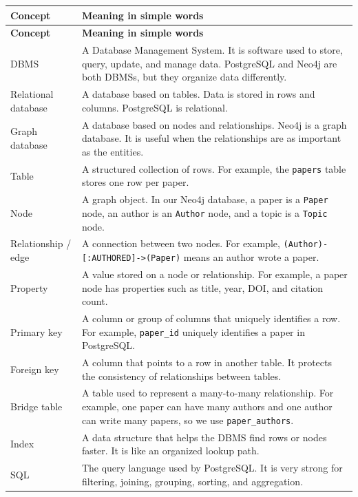 \documentclass[11pt]{article}
\begin{document}
\begin{longtable}{|p{}|p{}|}
\hline
\textbf{Concept} & \textbf{Meaning in simple words} \\
\hline
\endfirsthead
\hline
\textbf{Concept} & \textbf{Meaning in simple words} \\
\hline
\endhead
DBMS & A Database Management System. It is software used to store, query, update, and manage data. PostgreSQL and Neo4j are both DBMSs, but they organize data differently. \\
\hline
Relational database & A database based on tables. Data is stored in rows and columns. PostgreSQL is relational. \\
\hline
Graph database & A database based on nodes and relationships. Neo4j is a graph database. It is useful when the relationships are as important as the entities. \\
\hline
Table & A structured collection of rows. For example, the \texttt{papers} table stores one row per paper. \\
\hline
Node & A graph object. In our Neo4j database, a paper is a \texttt{Paper} node, an author is an \texttt{Author} node, and a topic is a \texttt{Topic} node. \\
\hline
Relationship / edge & A connection between two nodes. For example, \texttt{(Author)-[:AUTHORED]->(Paper)} means an author wrote a paper. \\
\hline
Property & A value stored on a node or relationship. For example, a paper node has properties such as title, year, DOI, and citation count. \\
\hline
Primary key & A column or group of columns that uniquely identifies a row. For example, \texttt{paper\_id} uniquely identifies a paper in PostgreSQL. \\
\hline
Foreign key & A column that points to a row in another table. It protects the consistency of relationships between tables. \\
\hline
Bridge table & A table used to represent a many-to-many relationship. For example, one paper can have many authors and one author can write many papers, so we use \texttt{paper\_authors}. \\
\hline
Index & A data structure that helps the DBMS find rows or nodes faster. It is like an organized lookup path. \\
\hline
SQL & The query language used by PostgreSQL. It is very strong for filtering, joining, grouping, sorting, and aggregation. \\

\end{longtable}
\end{document}
